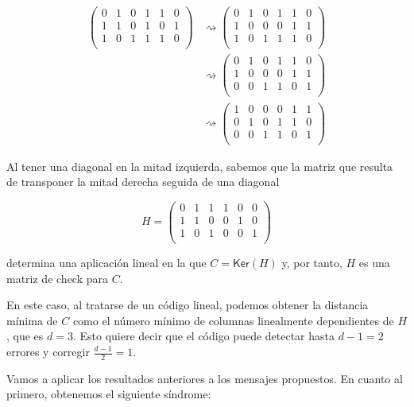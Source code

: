 \documentclass{article}
\begin{document}
\begin{align*}
\begin{pmatrix}
  0 & 1 & 0 & 1 & 1 & 0 \\ 
  1 & 1 & 0 & 1 & 0 & 1 \\
  1 & 0 & 1 & 1 & 1 & 0 \\
\end{pmatrix}
&\rightsquigarrow
\begin{pmatrix}
  0 & 1 & 0 & 1 & 1 & 0 \\ 
  1 & 0 & 0 & 0 & 1 & 1 \\
  1 & 0 & 1 & 1 & 1 & 0 \\
\end{pmatrix} \\
&\rightsquigarrow
\begin{pmatrix}
  0 & 1 & 0 & 1 & 1 & 0 \\ 
  1 & 0 & 0 & 0 & 1 & 1 \\
  0 & 0 & 1 & 1 & 0 & 1 \\
\end{pmatrix} \\
&\rightsquigarrow
\begin{pmatrix}
  1 & 0 & 0 & 0 & 1 & 1 \\
  0 & 1 & 0 & 1 & 1 & 0 \\ 
  0 & 0 & 1 & 1 & 0 & 1 \\
\end{pmatrix}
\end{align*}

Al tener una diagonal en la mitad izquierda, sabemos que la
matriz que resulta de transponer la mitad derecha seguida de una
diagonal 

$$
H = \begin{pmatrix}
  0 & 1 & 1 & 1 & 0 & 0 \\
  1 & 1 & 0 & 0 & 1 & 0 \\ 
  1 & 0 & 1 & 0 & 0 & 1 \\
\end{pmatrix}
$$

determina una aplicación lineal en la que $C = \mathsf{Ker}(H)$ y,
por tanto, $H$ es una matriz de check para $C$.

En este caso, al tratarse de un código lineal, podemos obtener la
distancia mínima de $C$ como el número mínimo de columnas
linealmente dependientes de $H$, que es $d = 3$. Esto quiere decir
que el código puede detectar hasta $d - 1 = 2$ errores y corregir
$\frac{d - 1}{2} = 1$.

Vamos a aplicar los resultados anteriores a los mensajes propuestos.
En cuanto al primero, obtenemos el siguiente síndrome:
\end{document}
